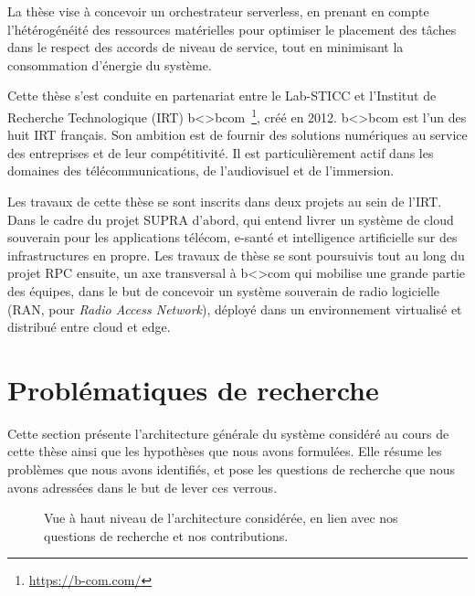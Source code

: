 La thèse vise à concevoir un orchestrateur serverless, en prenant en compte l’hétérogénéité des ressources matérielles pour optimiser le placement des tâches dans le respect des accords de niveau de service, tout en minimisant la consommation d'énergie du système.

Cette thèse s'est conduite en partenariat entre le Lab-STICC et l'Institut de Recherche Technologique (IRT) b{\textless\textgreater}bcom~\footnote{\href{https://b-com.com/}{https://b-com.com/}}, créé en 2012. b{\textless\textgreater}bcom est l'un des huit IRT français. Son ambition est de fournir des solutions numériques au service des entreprises et de leur compétitivité. Il est particulièrement actif dans les domaines des télécommunications, de l'audiovisuel et de l'immersion.

Les travaux de cette thèse se sont inscrits dans deux projets au sein de l'IRT. Dans le cadre du projet SUPRA d'abord, qui entend livrer un système de cloud souverain pour les applications télécom, e-santé et intelligence artificielle sur des infrastructures en propre. Les travaux de thèse se sont poursuivis tout au long du projet RPC ensuite, un axe transversal à b{\textless\textgreater}com qui mobilise une grande partie des équipes, dans le but de concevoir un système souverain de radio logicielle (RAN, pour \textit{Radio Access Network}), déployé dans un environnement virtualisé et distribué entre cloud et edge.

\section{Problématiques de recherche}

Cette section présente l'architecture générale du système considéré au cours de cette thèse ainsi que les hypothèses que nous avons formulées. Elle résume les problèmes que nous avons identifiés, et pose les questions de recherche que nous avons adressées dans le but de lever ces verrous.

\begin{figure}[!ht]
    \centering
    
	\caption{Vue à haut niveau de l'architecture considérée, en lien avec nos questions de recherche et nos contributions.}
	\label{fig:intro-architecture}
\end{figure}

